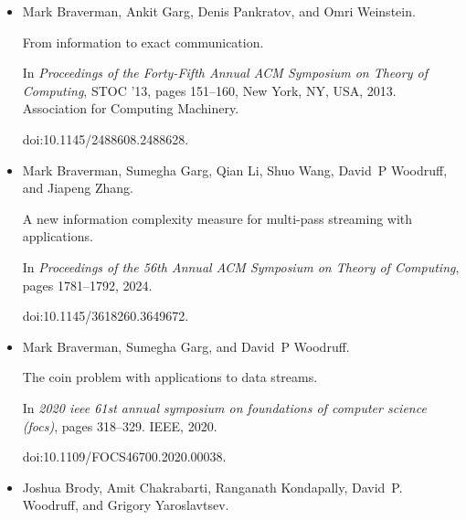 \begin{itemize}
Sujoy Bhore, Fabian Klute, and Jelle J Oostveen.


On streaming algorithms for geometric independent set and clique.


In \emph{International Workshop on Approximation and Online
Algorithms}, pages 211–224. Springer, 2022.


doi:10.1007/978-3-031-18367-6\_11.





\item[] 
[11]

Mark Braverman, Ankit Garg, Denis Pankratov, and Omri Weinstein.


From information to exact communication.


In \emph{Proceedings of the Forty-Fifth Annual ACM Symposium on Theory
of Computing}, STOC ’13, pages 151–160, New York, NY, USA, 2013. Association
for Computing Machinery.


doi:10.1145/2488608.2488628.





\item[] 
[12]

Mark Braverman, Sumegha Garg, Qian Li, Shuo Wang, David P Woodruff, and Jiapeng
Zhang.


A new information complexity measure for multi-pass streaming with
applications.


In \emph{Proceedings of the 56th Annual ACM Symposium on Theory of
Computing}, pages 1781–1792, 2024.


doi:10.1145/3618260.3649672.





\item[] 
[13]

Mark Braverman, Sumegha Garg, and David P Woodruff.


The coin problem with applications to data streams.


In \emph{2020 ieee 61st annual symposium on foundations of computer
science (focs)}, pages 318–329. IEEE, 2020.


doi:10.1109/FOCS46700.2020.00038.





\item[] 
[14]

Joshua Brody, Amit Chakrabarti, Ranganath Kondapally, David P. Woodruff, and
Grigory Yaroslavtsev.



\end{itemize}

